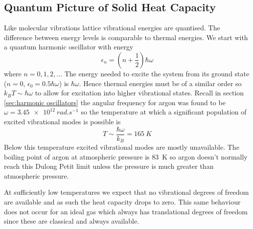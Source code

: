     \subsection{Quantum Picture of Solid Heat Capacity}
    Like molecular vibrations lattice vibrational energies are quantised.
    The difference between energy levels is comparable to thermal energies.
    We start with a quantum harmonic oscillator with energy
    \[\epsilon_n = \left(n + \frac{1}{2}\right)\hbar\omega\]
    where \(n = 0, 1, 2,\dotsc\)
    The energy needed to excite the system from its ground state (\(n = 0\), \(\epsilon_0 = 0.5\hbar\omega\)) is \(\hbar\omega\).
    Hence thermal energies must be of a similar order so \(k_BT\sim\hbar\omega\) to allow for excitation into higher vibrational states.
    Recall in section \ref{sec:harmonic oscillators} the angular frequency for argon was found to be \(\omega = \SI{3.45e12}{rad.s^{-1}}\) so the temperature at which a significant population of excited vibrational modes is possible is
    \[T\sim \frac{\hbar\omega}{k_B} = \SI{165}{K}\]
    Below this temperature excited vibrational modes are mostly unavailable.
    The boiling point of argon at atmospheric pressure is \SI{83}{K} so argon doesn't normally reach this Dulong Petit limit unless the pressure is much greater than atmospheric pressure.
    
    At sufficiently low temperatures we expect that no vibrational degrees of freedom are available and as such the heat capacity drops to zero.
    This same behaviour does not occur for an ideal gas which always has translational degrees of freedom since these are classical and always available.
    
